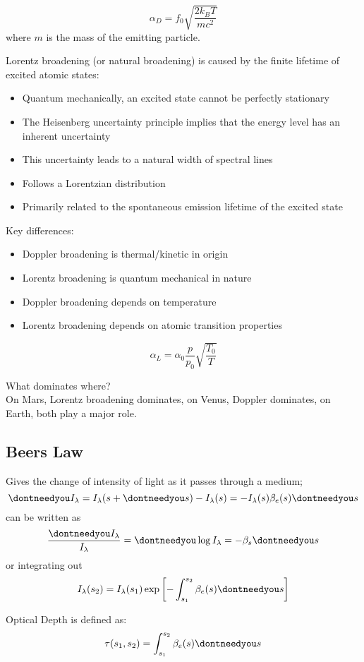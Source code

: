 \documentclass[12pt, a4paper]{article} %
\let\d\dontneedyou
\DeclareMathOperator{\d}{d}
\begin{document}
\begin{equation}
    \alpha_D = f_0 \sqrt{\frac{2k_B T}{mc^2}}
\end{equation}
where $m$ is the mass of the emitting particle.

Lorentz broadening (or natural broadening) is caused by the finite lifetime of excited atomic states:
\begin{itemize}
    \item Quantum mechanically, an excited state cannot be perfectly stationary
    \item The Heisenberg uncertainty principle implies that the energy level has an inherent uncertainty
    \item This uncertainty leads to a natural width of spectral lines
    \item Follows a Lorentzian distribution
    \item Primarily related to the spontaneous emission lifetime of the excited state
\end{itemize}

Key differences:
\begin{itemize}
    \item Doppler broadening is thermal/kinetic in origin
    \item Lorentz broadening is quantum mechanical in nature
    \item Doppler broadening depends on temperature
    \item Lorentz broadening depends on atomic transition properties
\end{itemize}
\begin{equation}
    \alpha_L = \alpha_0 \frac{p}{p_0} \sqrt{\frac{T_0}{T}}
\end{equation}

What dominates where? \\

On Mars, Lorentz broadening dominates, on Venus, Doppler dominates, on Earth, both play a major role.



\subsection{Beers Law}

Gives the change of intensity of light as it passes through a medium;
\begin{equation*}
	\d I_\lambda = I_\lambda(s + \d s) - I_\lambda(s) = -I_\lambda(s)\beta_e(s) \d s
\end{equation*}
can be written as
\begin{equation*}
	\frac{\d I_\lambda}{I_\lambda} = \d \log I_\lambda = - \beta_s \d s
\end{equation*}
or integrating out
\begin{equation}
	I_\lambda(s_2) = I_\lambda(s_1) \exp\left[- \int_{s_1}^{s_2} \beta_e(s) \d s \right]
\end{equation}

Optical Depth is defined as:
\begin{equation}
    \tau(s_1, s_2) = \int_{s_1}^{s_2} \beta_e(s) \d s
\end{equation}
\end{document}
